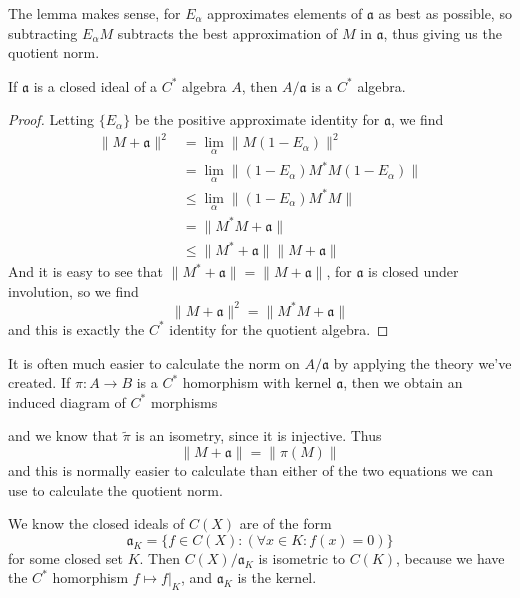 The lemma makes sense, for $E_\alpha$ approximates elements of $\mathfrak{a}$ as best as possible, so subtracting $E_\alpha M$ subtracts the best approximation of $M$ in $\mathfrak{a}$, thus giving us the quotient norm.

\begin{theorem}
    If $\mathfrak{a}$ is a closed ideal of a $C^*$ algebra $A$, then $A/\mathfrak{a}$ is a $C^*$ algebra.
\end{theorem}
\begin{proof}
    Letting $\{ E_\alpha \}$ be the positive approximate identity for $\mathfrak{a}$, we find
    \begin{align*}
        \| M + \mathfrak{a} \|^2 &= \lim_\alpha \| M (1 - E_\alpha) \|^2\\
        &= \lim_\alpha \| (1 - E_\alpha) M^*M (1 - E_\alpha) \|\\
        &\leq \lim_\alpha \| (1 - E_\alpha) M^*M \|\\
        &= \| M^*M + \mathfrak{a} \|\\
        &\leq \| M^* + \mathfrak{a} \| \| M + \mathfrak{a} \|
    \end{align*}
    And it is easy to see that $\| M^* + \mathfrak{a} \| = \| M + \mathfrak{a} \|$, for $\mathfrak{a}$ is closed under involution, so we find
    \[ \| M + \mathfrak{a} \|^2 = \| M^*M + \mathfrak{a} \| \]
    and this is exactly the $C^*$ identity for the quotient algebra.
\end{proof}

It is often much easier to calculate the norm on $A/\mathfrak{a}$ by applying the theory we've created. If $\pi: A \to B$ is a $C^*$ homorphism with kernel $\mathfrak{a}$, then we obtain an induced diagram of $C^*$ morphisms
%
\begin{center}
\end{center}
%
and we know that $\tilde{\pi}$ is an isometry, since it is injective. Thus
%
\[ \| M + \mathfrak{a} \| = \| \pi(M) \| \]
%
and this is normally easier to calculate than either of the two equations we can use to calculate the quotient norm.

\begin{example}
    We know the closed ideals of $C(X)$ are of the form
    \[ \mathfrak{a}_K = \{ f \in C(X) : (\forall x \in K: f(x) = 0) \} \]
    for some closed set $K$. Then $C(X)/\mathfrak{a}_K$ is isometric to $C(K)$, because we have the $C^*$ homorphism $f \mapsto f|_K$, and $\mathfrak{a}_K$ is the kernel.
\end{example}

